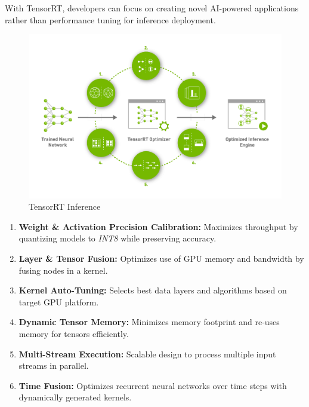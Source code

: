         With TensorRT, developers can focus on creating novel AI-powered applications rather than performance tuning for inference deployment.
        \begin{figure}[H]
            \centering
            \includegraphics[width=0.6\linewidth]{img/inference-tensorrt.png}
            \caption{TensorRT Inference}
        \end{figure}
        \begin{enumerate}
            \item \textbf{Weight \& Activation Precision Calibration:} Maximizes throughput by quantizing models to \emph{INT8} while preserving accuracy.
            \item \textbf{Layer \& Tensor Fusion:} Optimizes use of GPU memory and bandwidth by fusing nodes in a kernel.
            \item \textbf{Kernel Auto-Tuning:} Selects best data layers and algorithms based on target GPU platform.
            \item \textbf{Dynamic Tensor Memory:} Minimizes memory footprint and re-uses memory for tensors efficiently.
            \item \textbf{Multi-Stream Execution:} Scalable design to process multiple input streams in parallel.
            \item \textbf{Time Fusion:} Optimizes recurrent neural networks over time steps with dynamically generated kernels.
        \end{enumerate}
